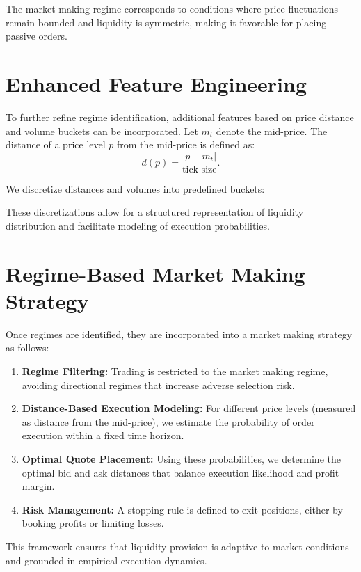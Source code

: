 \documentclass[12pt,a4paper]{report}
\begin{document}
The market making regime corresponds to conditions where price fluctuations remain bounded and liquidity is symmetric, making it favorable for placing passive orders.

\section{Enhanced Feature Engineering}

To further refine regime identification, additional features based on price distance and volume buckets can be incorporated. Let $m_t$ denote the mid-price. The distance of a price level $p$ from the mid-price is defined as:
\[
d(p) = \frac{|p - m_t|}{\text{tick size}}.
\]

We discretize distances and volumes into predefined buckets:

These discretizations allow for a structured representation of liquidity distribution and facilitate modeling of execution probabilities.

\section{Regime-Based Market Making Strategy}

Once regimes are identified, they are incorporated into a market making strategy as follows:

\begin{enumerate}
    \item \textbf{Regime Filtering:} Trading is restricted to the market making regime, avoiding directional regimes that increase adverse selection risk.
    
    \item \textbf{Distance-Based Execution Modeling:} For different price levels (measured as distance from the mid-price), we estimate the probability of order execution within a fixed time horizon.
    
    \item \textbf{Optimal Quote Placement:} Using these probabilities, we determine the optimal bid and ask distances that balance execution likelihood and profit margin.
    
    \item \textbf{Risk Management:} A stopping rule is defined to exit positions, either by booking profits or limiting losses.
\end{enumerate}

This framework ensures that liquidity provision is adaptive to market conditions and grounded in empirical execution dynamics.
\end{document}
